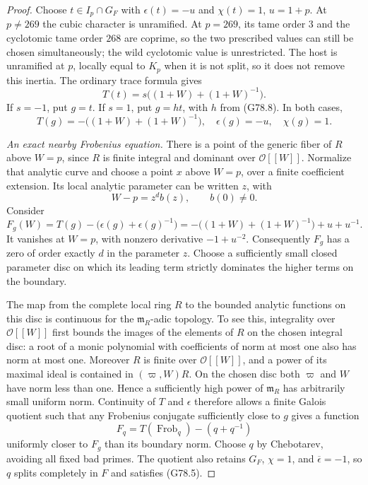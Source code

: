 \begin{proof}
Choose \(t\in I_p\cap G_F\) with
\(\epsilon(t)=-u\) and \(\chi(t)=1\), \(u=1+p\).
At \(p\ne269\) the cubic character is unramified.
At \(p=269\), its tame order \(3\) and the cyclotomic tame
order \(268\) are coprime, so the two prescribed values can
still be chosen simultaneously; the wild cyclotomic value
is unrestricted.
The host is unramified at \(p\), locally equal to \(K_p\)
when it is not split, so it does not remove this inertia.
The ordinary trace formula gives
\[
 T(t)=s\bigl((1+W)+(1+W)^{-1}\bigr).
\]
If \(s=-1\), put \(g=t\).
If \(s=1\), put \(g=ht\), with \(h\) from (G78.8).
In both cases,
\[
 T(g)=-\bigl((1+W)+(1+W)^{-1}\bigr),\quad
 \epsilon(g)=-u,\quad \chi(g)=1.                       \tag{G78.9}
\]

\emph{An exact nearby Frobenius equation.}
There is a point of the generic fiber of \(R\) above \(W=p\),
since \(R\) is finite integral and dominant over
\(\mathcal O[[W]]\).
Normalize that analytic curve and choose a point \(x\)
above \(W=p\), over a finite coefficient extension.
Its local analytic parameter can be written \(z\), with
\[
                        W-p=z^d b(z),\qquad b(0)\ne0.
\]
Consider
\[
 F_g(W)=T(g)-\bigl(\epsilon(g)+\epsilon(g)^{-1}\bigr)
 =-\bigl((1+W)+(1+W)^{-1}\bigr)+u+u^{-1}.
\]
It vanishes at \(W=p\), with nonzero derivative
\(-1+u^{-2}\).
Consequently \(F_g\) has a zero of order exactly \(d\)
in the parameter \(z\).
Choose a sufficiently small closed parameter disc on which
its leading term strictly dominates the higher terms
on the boundary.

The map from the complete local ring \(R\) to the bounded
analytic functions on this disc is continuous for the
\(\mathfrak m_R\)-adic topology.
To see this, integrality over \(\mathcal O[[W]]\) first bounds
the images of the elements of \(R\) on the chosen integral disc:
a root of a monic polynomial with coefficients of norm at most
one also has norm at most one.
Moreover \(R\) is finite over
\(\mathcal O[[W]]\), and a power of its maximal ideal is
contained in \((\varpi,W)R\).  On the chosen disc both
\(\varpi\) and \(W\) have norm less than one.
Hence a sufficiently high power of \(\mathfrak m_R\)
has arbitrarily small uniform norm.
Continuity of \(T\) and \(\epsilon\) therefore allows a
finite Galois quotient such that any Frobenius conjugate
sufficiently close to \(g\) gives a function
\[
 F_q=T(\operatorname{Frob}_q)-(q+q^{-1})
\]
uniformly closer to \(F_g\) than its boundary norm.
Choose \(q\) by Chebotarev, avoiding all fixed bad primes.
The quotient also retains \(G_F\), \(\chi=1\), and
\(\overline\epsilon=-1\), so \(q\) splits completely in \(F\)
and satisfies (G78.5).


\end{proof}
